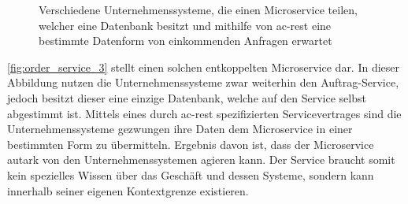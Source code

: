     \begin{figure}[h!]
      \vspace{.02\textheight}
      \centering
      \caption{Verschiedene Unternehmenssysteme, die einen Microservice teilen, welcher eine Datenbank besitzt und mithilfe von \acrshort{ac-rest} eine bestimmte Datenform von einkommenden Anfragen erwartet}
      \label{fig:order_service_3}
    \end{figure}
    
    \autoref{fig:order_service_3} stellt einen solchen entkoppelten Microservice dar. In dieser Abbildung nutzen die Unternehmenssysteme zwar weiterhin den Auftrag-Service, jedoch besitzt dieser eine einzige Datenbank, welche auf den Service selbst abgestimmt ist. Mittels eines durch \gls{ac-rest} spezifizierten Servicevertrages sind die Unternehmenssysteme gezwungen ihre Daten dem Microservice in einer bestimmten Form zu übermitteln. Ergebnis davon ist, dass der Microservice autark von den Unternehmenssystemen agieren kann. Der Service braucht somit kein spezielles Wissen über das Geschäft und dessen Systeme, sondern kann innerhalb seiner eigenen Kontextgrenze existieren.

